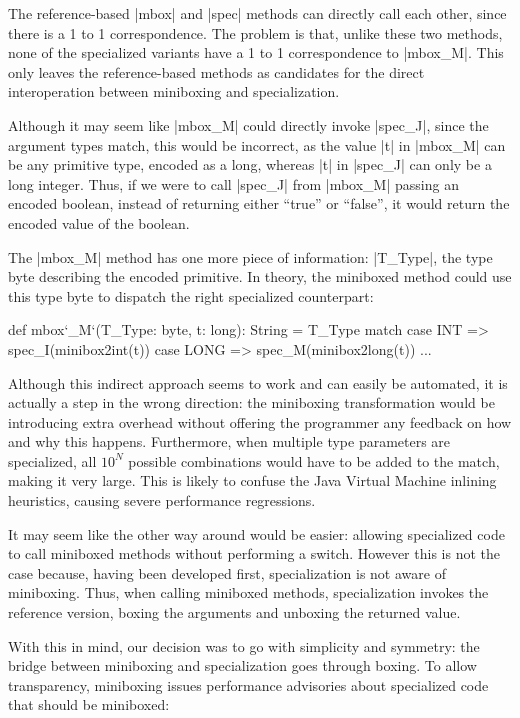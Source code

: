 The reference-based |mbox| and |spec| methods can directly call each other, since there is a 1 to 1 correspondence. The problem is that, unlike these two methods, none of the specialized variants have a 1 to 1 correspondence to |mbox_M|. This only leaves the reference-based methods as candidates for the direct interoperation between miniboxing and specialization.

Although it may seem like |mbox_M| could directly invoke |spec_J|, since the argument types match, this would be incorrect, as the value |t| in |mbox_M| can be any primitive type, encoded as a long, whereas |t| in |spec_J| can only be a long integer. Thus, if we were to call |spec_J| from |mbox_M| passing an encoded boolean, instead of returning either ``true'' or ``false'', it would return the encoded value of the boolean.

The |mbox_M| method has one more piece of information: |T_Type|, the type byte describing the encoded primitive. In theory, the miniboxed method could use this type byte to dispatch the right specialized counterpart:

\begin{lstlisting-nobreak}
 def mbox`_M`(T_Type: byte, t: long): String =
   T_Type match {
     case INT     => spec_I(minibox2int(t))
     case LONG => spec_M(minibox2long(t))
     ...
   }
\end{lstlisting-nobreak}

Although this indirect approach seems to work and can easily be automated, it is actually a  step in the wrong direction: the miniboxing transformation would be introducing extra overhead without offering the programmer any feedback on how and why this happens. Furthermore, when multiple type parameters are specialized, all $10^N$ possible combinations would have to be added to the match, making it very large. This is likely to confuse the Java Virtual Machine inlining heuristics, causing severe performance regressions.

It may seem like the other way around would be easier: allowing specialized code to call miniboxed methods without performing a switch. However this is not the case because, having been developed first, specialization is not aware of miniboxing. Thus, when calling miniboxed methods, specialization invokes the reference version, boxing the arguments and unboxing the returned value.

With this in mind, our decision was to go with simplicity and symmetry: the bridge between miniboxing and specialization goes through boxing. To allow transparency, miniboxing issues performance advisories about specialized code that should be miniboxed:



